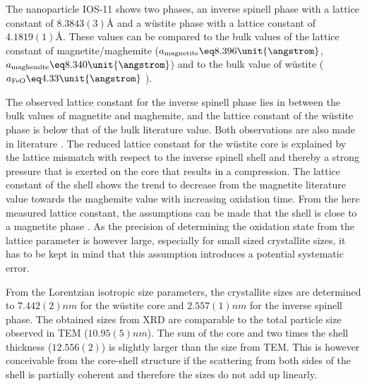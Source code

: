 \documentclass[\main/dresen_thesis.tex]{subfiles}
\begin{document}
    The nanoparticle IOS-11 shows two phases, an inverse spinell phase with a lattice constant of $8.3843(3) \unit{\angstrom}$ and a w\"ustite phase with a lattice constant of $4.1819(1) \unit{\angstrom}$.
    These values can be compared to the bulk values of the lattice constant of magnetite/maghemite ($a_\mathrm{magnetite} \eq 8.396 \unit{\angstrom}$, $a_\mathrm{maghemite} \eq 8.340 \unit{\angstrom}$) \cite{Cornell_2003_Their} and to the bulk value of w\"ustite ($a_\mathrm{FeO} \eq 4.33 \unit{\angstrom}$ \cite{Hentschel_1970_Stoich}).

    The observed lattice constant for the inverse spinell phase lies in between the bulk values of magnetite and maghemite, and the lattice constant of the w\"ustite phase is below that of the bulk literature value.
    Both observations are also made in literature \cite{Wetterskog_2013_Anoma}.
    The reduced lattice constant for the w\"ustite core is explained by the lattice mismatch with respect to the inverse spinell shell and thereby a strong pressure that is exerted on the core that results in a compression.
    The lattice constant of the shell shows the trend to decrease from the magnetite literature value towards the maghemite value with increasing oxidation time.
    From the here measured lattice constant, the assumptions can be made that the shell is close to a magnetite phase \cite{Cervellino_2014_Latti}.
    As the precision of determining the oxidation state from the lattice parameter is however large, especially for small sized crystallite sizes, it has to be kept in mind that this assumption introduces a potential systematic error.

    From the Lorentzian isotropic size parameters, the crystallite sizes are determined to $7.442(2) \unit{nm}$ for the w\"ustite core and $2.557(1) \unit{nm}$ for the inverse spinell phase.
    The obtained sizes from XRD are comparable to the total particle size observed in TEM ($10.95(5) \unit{nm}$).
    The sum of the core and two times the shell thickness ($12.556(2)$) is slightly larger than the size from TEM.
    This is however conceivable from the core-shell structure if the scattering from both sides of the shell is partially coherent and therefore the sizes do not add up linearly.


\end{document}
